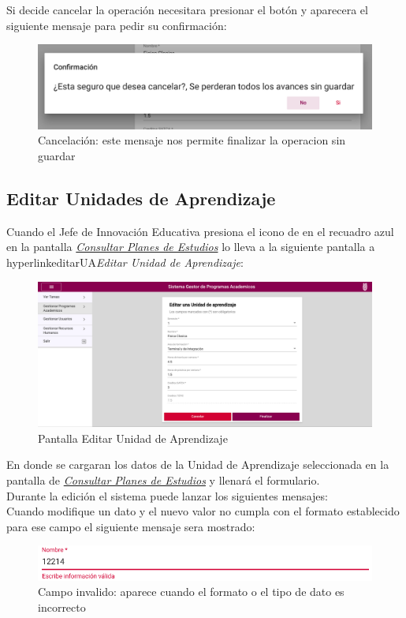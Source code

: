 Si decide cancelar la operación necesitara presionar el botón  y aparecera el siguiente mensaje para pedir su confirmación:\\
\begin{figure}[!hbtp]
    \centering
    \hypertarget{cancelarR}{\includegraphics[width=0.7\linewidth]{images/GUA/cancelar}}
    \caption{Cancelación: este mensaje nos permite finalizar la operacion sin guardar}
    \label{cancelarR}
\end{figure}
\newpage
\subsection{Editar Unidades de Aprendizaje}
Cuando el Jefe de Innovación Educativa presiona el icono de \BtnLapiz en el recuadro azul en la pantalla \hyperlink{consultarUA}{\textit{Consultar Planes de Estudios}} lo lleva a la siguiente pantalla a hyperlink{editarUA}{\textit{Editar Unidad de Aprendizaje}}:\\
\begin{figure}[!hbtp]
    \centering
    \hypertarget{editarUA}{\includegraphics[width=0.7\linewidth]{images/GUA/editarUA}}
    \caption{Pantalla Editar Unidad de Aprendizaje}
    \label{editarUA}
\end{figure}
En donde se cargaran los datos de la Unidad de Aprendizaje seleccionada en la pantalla de \hyperlink{consultarUA}{\textit{Consultar Planes de Estudios}}  y llenará el formulario.\\
Durante la edición el sistema puede lanzar los siguientes mensajes:\\
Cuando modifique un dato y el nuevo valor no cumpla con el formato establecido para ese campo el siguiente mensaje sera mostrado:\\
\begin{figure}[!hbtp]
    \centering
    \hypertarget{invalidoE}{\includegraphics[width=0.7\linewidth]{images/GUA/invalido}}
    \caption{Campo invalido: aparece cuando el formato o el tipo de dato es incorrecto}
    \label{invalidoE}
\end{figure}

